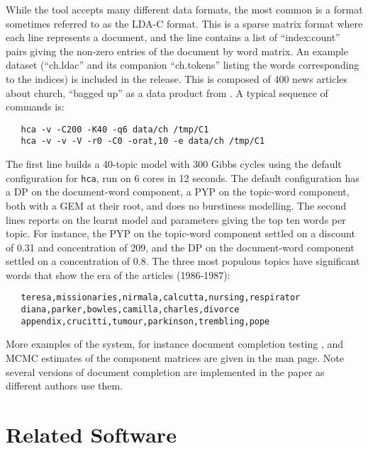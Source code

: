 \documentclass[twoside,11pt]{article}
\begin{document}
While the tool accepts many different data formats, the
most common is a format sometimes referred to as the LDA-C format.
This is a sparse matrix format where each line represents a document,
and the line contains a list of ``index:count'' pairs giving the
non-zero entries of the document by word matrix.  An example dataset
(``ch.ldac'' and its companion ``ch.tokens'' listing the words
corresponding to the indices) is included in the release.
This is composed of 400 news articles about church, ``bagged up''
as a data product from \cite{Lewis:2004}.
A typical sequence of commands is:
\begin{verbatim}
   hca -v -C200 -K40 -q6 data/ch /tmp/C1
   hca -v -v -V -r0 -C0 -orat,10 -e data/ch /tmp/C1
\end{verbatim}
The first line builds a 40-topic model with 300 Gibbs cycles
using the default configuration
for {\tt hca}, run on 6 cores in 12 seconds.
The default configuration has a DP on the document-word component,
a PYP on the topic-word component,
both with a GEM at their root, and does no burstiness modelling.
The second lines reports on the learnt model and parameters
giving the top ten words per topic.
For instance, the PYP on the topic-word
component settled on a discount of 0.31 and concentration of 209,
and the DP on the document-word component settled on a concentration of 0.8.
The three most populous topics have significant words that show the
era of the articles (1986-1987):
\begin{verbatim}
   teresa,missionaries,nirmala,calcutta,nursing,respirator
   diana,parker,bowles,camilla,charles,divorce
   appendix,crucitti,tumour,parkinson,trembling,pope
\end{verbatim}
More examples of the system, for instance document completion
testing \cite{Buntine09},
and MCMC estimates of the component matrices
are given in the man page.
Note several versions of document completion are implemented
in the paper as different authors use them.

\section{Related Software}




\end{document}
